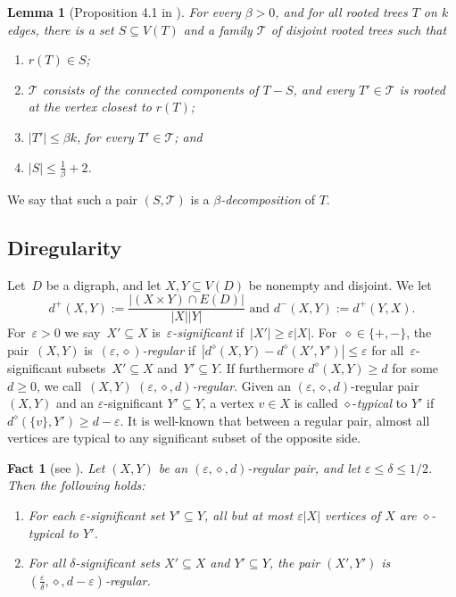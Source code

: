 \documentclass[11pt]{article}
\newtheorem{lemma}[theorem]{Lemma}
\newtheorem{fact}[theorem]{Fact}
\numberwithin{equation}{section}
\renewcommand{\geq}{\geqslant}
\renewcommand{\leq}{\leqslant}
\newcommand{\defi}[1]{\emph{\color{red!50!black}#1}}
\let\eps=\varepsilon
\newcommand{\cT}{\mathcal{T}}
\theoremstyle{definition}
\def\eps{{\varepsilon}}
\begin{document}
\begin{lemma}[Proposition 4.1 in \cite{BPS1}]
  \label{lemma:cutting_1}
  For every $\beta > 0$, and for all rooted trees $T$ on $k$ edges,
  there is a set $S \subseteq V(T)$ and a family $\mathcal{T}$ of disjoint
  rooted trees such that 
  \begin{enumerate}[label = \upshape{(\alph*)}]
    \item $r(T) \in S$;
    \item $\mathcal{T}$ consists of the connected components of $T - S$, and every $T'\in \mathcal{T}$
          is rooted at the vertex closest to $r(T)$;
    \item $|T'| \leq \beta k$, for every $T' \in \mathcal{T}$; and
    \item $|S| \leq \frac{1}{\beta} + 2$.
  \end{enumerate}
\end{lemma}
  We say that such a pair $(S,\cT)$ is a \defi{$\beta$-decomposition} of $T$. 

\subsection{Diregularity}\label{sec:diregularity}
Let~$D$ be a digraph, and let $X,Y \subseteq V(D)$ be nonempty and disjoint. We let
\[
  \text{$d^{+}(X,Y) := \frac{|(X\times Y)\cap E(D)|}{|X||Y|}$ \ and \ $d^{-}(X,Y):=d^+(Y,X)$.}
\]
 For~$\eps > 0$ we say~${X' \subseteq X}$
is~\defi{$\eps$\nobreakdash-significant} if~${|X'| \geq \eps|X|}$.
For~${\diamond \in \{+,-\}}$, the pair~$(X,Y)$
is~\defi{$(\eps,\diamond)$-regular}
if~${|d^{\diamond}(X,Y) - d^{\diamond}(X',Y')| \leq \eps}$ for
all~{$\eps$\nobreakdash-significant} subsets~${X' \subseteq X}$
and~${Y' \subseteq Y}$. If furthermore ${d^{\diamond}(X,Y) \geq d}$ for
some~${d\geq 0}$, we call~$(X,Y)$ \defi{$(\eps,\diamond,d)$-regular}. Given an $(\eps,\diamond,d)$-regular pair $(X, Y)$ and an $\eps$-significant $Y'\subseteq Y$, a vertex $v\in X$ is called $\diamond$-\defi{typical} to $Y'$ if $d^\diamond(\{v\},Y')\geq d-\eps$. It is well-known that between a regular pair, almost all vertices are typical to any significant subset of the opposite side.

\begin{fact} [see \cite{komlos2000regularity}] \label{fact:typical} 
    Let $(X, Y)$ be an $(\eps,\diamond,d)$-regular pair, and let $\eps\leq \delta \leq 1/2$. Then the following holds:
    \begin{enumerate}[label = \upshape{(\alph*)}]
        \item For each $\eps$-significant set $Y'\subseteq Y$, all but at most $\eps|X|$ vertices of $X$ are $\diamond$-typical to $Y'$.
        \item For all $\delta$-significant sets $X' \subseteq X$ and $Y' \subseteq Y$, the pair $(X',Y')$ is $(\frac{\eps}{\delta}, \diamond, d-\eps)$-regular.
    \end{enumerate}
\end{fact}
\end{document}

